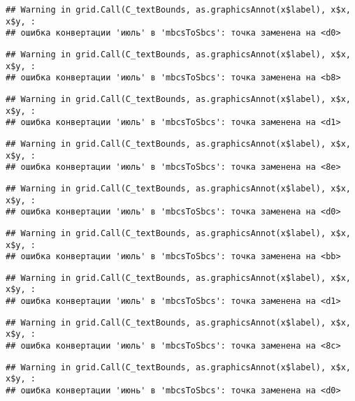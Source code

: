 \documentclass[
]{article}
\begin{document}
\begin{verbatim}
## Warning in grid.Call(C_textBounds, as.graphicsAnnot(x$label), x$x, x$y, :
## ошибка конвертации 'июль' в 'mbcsToSbcs': точка заменена на <d0>
\end{verbatim}

\begin{verbatim}
## Warning in grid.Call(C_textBounds, as.graphicsAnnot(x$label), x$x, x$y, :
## ошибка конвертации 'июль' в 'mbcsToSbcs': точка заменена на <b8>
\end{verbatim}

\begin{verbatim}
## Warning in grid.Call(C_textBounds, as.graphicsAnnot(x$label), x$x, x$y, :
## ошибка конвертации 'июль' в 'mbcsToSbcs': точка заменена на <d1>
\end{verbatim}

\begin{verbatim}
## Warning in grid.Call(C_textBounds, as.graphicsAnnot(x$label), x$x, x$y, :
## ошибка конвертации 'июль' в 'mbcsToSbcs': точка заменена на <8e>
\end{verbatim}

\begin{verbatim}
## Warning in grid.Call(C_textBounds, as.graphicsAnnot(x$label), x$x, x$y, :
## ошибка конвертации 'июль' в 'mbcsToSbcs': точка заменена на <d0>
\end{verbatim}

\begin{verbatim}
## Warning in grid.Call(C_textBounds, as.graphicsAnnot(x$label), x$x, x$y, :
## ошибка конвертации 'июль' в 'mbcsToSbcs': точка заменена на <bb>
\end{verbatim}

\begin{verbatim}
## Warning in grid.Call(C_textBounds, as.graphicsAnnot(x$label), x$x, x$y, :
## ошибка конвертации 'июль' в 'mbcsToSbcs': точка заменена на <d1>
\end{verbatim}

\begin{verbatim}
## Warning in grid.Call(C_textBounds, as.graphicsAnnot(x$label), x$x, x$y, :
## ошибка конвертации 'июль' в 'mbcsToSbcs': точка заменена на <8c>
\end{verbatim}

\begin{verbatim}
## Warning in grid.Call(C_textBounds, as.graphicsAnnot(x$label), x$x, x$y, :
## ошибка конвертации 'июнь' в 'mbcsToSbcs': точка заменена на <d0>
\end{verbatim}
\end{document}
